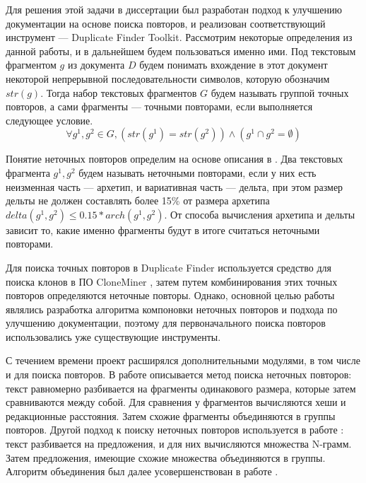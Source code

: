 \documentclass[14pt]{matmex-diploma-custom}
\begin{document}
Для решения этой задачи в диссертации \cite{bib:tool:DuplicateFinder} был разработан подход к улучшению документации  на основе поиска повторов, и реализован соответствующий инструмент --- Duplicate Finder Toolkit. Рассмотрим некоторые определения из данной работы, и в дальнейшем будем пользоваться именно ими. Под текстовым фрагментом $g$ из документа $D$ будем понимать вхождение в этот документ некоторой непрерывной последовательности символов, которую обозначим $str(g)$. Тогда набор текстовых фрагментов $G$ будем называть группой точных повторов, а сами фрагменты --- точными повторами, если выполняется следующее условие.
\begin{equation}
	\forall g^1,g^2\in G, (str(g^1)=str(g^2))\land(g^1\cap g^2 = \emptyset)
\end{equation}

Понятие неточных повторов определим на основе описания в \cite{bib:art:bassett}. Два текстовых фрагмента $g^1,g^2$ будем называть неточными повторами, если у них есть неизменная часть --- архетип, и вариативная часть --- дельта, при этом размер дельты не должен составлять более 15\% от размера архетипа $delta(g^1,g^2) \leq 0.15 * arch(g^1,g^2)$. От способа вычисления архетипа и дельты зависит то, какие именно фрагменты будут в итоге считаться неточными повторами.

Для поиска точных повторов в Duplicate Finder используется средство для поиска клонов в ПО CloneMiner \cite{bib:tool:CloneMiner}, затем путем комбинирования этих точных повторов определяются неточные повторы. Однако, основной целью работы являлись разработка алгоритма компоновки неточных повторов и подхода по улучшению документации, поэтому для первоначального поиска повторов использовались уже существующие инструменты.

С течением времени проект расширялся дополнительными модулями, в том числе и для поиска повторов. В работе \cite{bib:tool:FuzzySearch} описывается метод поиска неточных повторов: текст равномерно разбивается на фрагменты одинакового размера, которые затем сравниваются между собой. Для сравнения у фрагментов вычисляются хеши и редакционные расстояния. Затем схожие фрагменты объединяются в группы повторов. Другой подход к поиску неточных повторов используется в работе \cite{bib:tool:NgramSearch}: текст разбивается на предложения, и для них вычисляются множества N-грамм. Затем предложения, имеющие схожие множества объединяются в группы. Алгоритм объединения был далее усовершенствован в работе \cite{bib:tool:ImprovedNgramSearch}.
\end{document}
